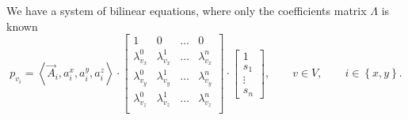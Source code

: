 We have a system of bilinear equations,
where only the coefficients matrix $\Lambda$ is known
\begin{equation}\label{eq:bilinear:matrix}
  p_{v_i}
  = \left\langle \vec{A}_i, a_i^x, a_i^y, a_i^z \right\rangle
    \cdot \begin{bmatrix}
      1               & 0               & \dots & 0 \\
      \lambda^0_{v_x} & \lambda^1_{v_x} & \dots & \lambda^n_{v_x} \\
      \lambda^0_{v_y} & \lambda^1_{v_y} & \dots & \lambda^n_{v_y} \\
      \lambda^0_{v_z} & \lambda^1_{v_z} & \dots & \lambda^n_{v_z} \\
    \end{bmatrix}
    \cdot \begin{bmatrix}
      1 \\
      s_1 \\
      \vdots \\
      s_n
    \end{bmatrix},
  \qquad v \in V,
  \qquad i \in \left\{ x, y \right\}.
\end{equation}

